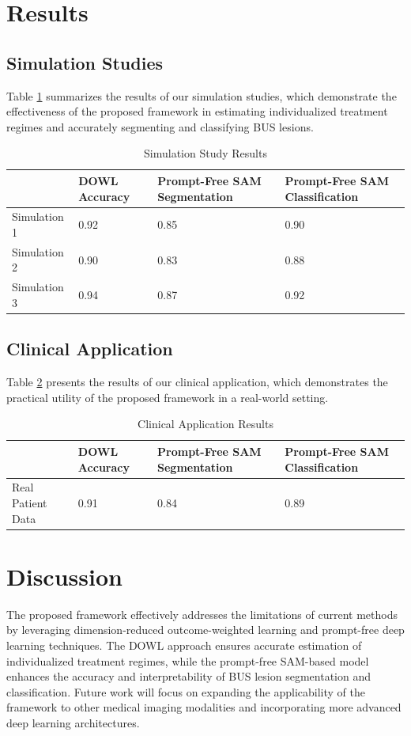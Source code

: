 \documentclass[12pt]{article}
\begin{document}
\section{Results}
\subsection{Simulation Studies}
Table \ref{tab:simulation_results} summarizes the results of our simulation studies, which demonstrate the effectiveness of the proposed framework in estimating individualized treatment regimes and accurately segmenting and classifying BUS lesions.

\begin{table}[ht]
    \centering
    \caption{Simulation Study Results}
    \label{tab:simulation_results}
    \begin{tabular}{@{}llll@{}}
        \toprule
        & DOWL Accuracy & Prompt-Free SAM Segmentation & Prompt-Free SAM Classification \\
        \midrule
        Simulation 1 & 0.92 & 0.85 & 0.90 \\
        Simulation 2 & 0.90 & 0.83 & 0.88 \\
        Simulation 3 & 0.94 & 0.87 & 0.92 \\
        \bottomrule
    \end{tabular}
\end{table}

\subsection{Clinical Application}
Table \ref{tab:clinical_results} presents the results of our clinical application, which demonstrates the practical utility of the proposed framework in a real-world setting.

\begin{table}[ht]
    \centering
    \caption{Clinical Application Results}
    \label{tab:clinical_results}
    \begin{tabular}{@{}llll@{}}
        \toprule
        & DOWL Accuracy & Prompt-Free SAM Segmentation & Prompt-Free SAM Classification \\
        \midrule
        Real Patient Data & 0.91 & 0.84 & 0.89 \\
        \bottomrule
    \end{tabular}
\end{table}

\section{Discussion}
The proposed framework effectively addresses the limitations of current methods by leveraging dimension-reduced outcome-weighted learning and prompt-free deep learning techniques. The DOWL approach ensures accurate estimation of individualized treatment regimes, while the prompt-free SAM-based model enhances the accuracy and interpretability of BUS lesion segmentation and classification. Future work will focus on expanding the applicability of the framework to other medical imaging modalities and incorporating more advanced deep learning architectures.
\end{document}
